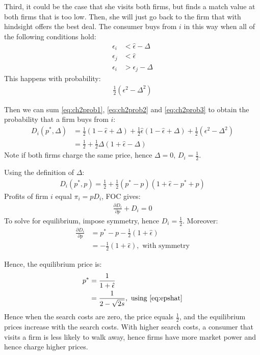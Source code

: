 \documentclass[12pt]{article}
\numberwithin{equation}{section}
\newcommand{\1}[1]{\,\mathbbm{1}_{#1}} %
\begin{document}
Third, it could be the case that she visits both firms, but finds a match value at both
firms that is too low. Then, she will just go back to the firm that with hindsight offers
the best deal. The consumer buys from $i$ in this way when all of the
following conditions hold:
\begin{align}
	\epsilon_i & <\hat\epsilon-\Delta \\
	\epsilon_j & <\hat\epsilon        \\
	\epsilon_i & >\epsilon_j-\Delta
\end{align}
This happens with probability:
\begin{align}
	\frac{1}{2}(\epsilon^2-\Delta^2)
	\label{eq:ch2prob3}
\end{align}

Then we can sum \ref{eq:ch2prob1}, \ref{eq:ch2prob2} and
\ref{eq:ch2prob3} to obtain the probability that a firm buys from $i$:
\begin{align}
	D_i(p^*,\Delta) & =
	\frac{1}{2}(1-\hat\epsilon+\Delta)+
	\frac{1}{2}\hat\epsilon(1-\hat\epsilon+\Delta)+
	\frac{1}{2}(\epsilon^2-\Delta^2)                                         \\
	                & = \frac{1}{2}+\frac{1}{2}\Delta(1+\hat\epsilon-\Delta)
\end{align}
Note if both firms charge the same price, hence $\Delta=0$,
$D_i=\frac{1}{2}$.

Using the definition of $\Delta$:
\begin{align}
	D_i(p^*,p)=\frac{1}{2}+\frac{1}{2}(p^*-p)(1+\hat\epsilon-p^*+p)
\end{align}
Profits of firm $i$ equal $\pi_i=pD_i$, FOC gives:
\begin{align}
	\frac{\partial D_i}{\partial p}+D_i=0
\end{align}
To solve for equilibrium, impose symmetry, hence $D_i=\frac{1}{2}$.
Moreover:
\begin{align}
	\frac{\partial D_i}{\partial p} & =p^*-p-\frac{1}{2}(1+\hat\epsilon)                  \\
	                                & =-\frac{1}{2}(1+\hat\epsilon),\text{ with symmetry}
\end{align}

Hence, the equilibrium price is:
\begin{align}
	p^* & =\frac{1}{1+\hat\epsilon}                            \\
	    & =\frac{1}{2-\sqrt{2s}},\text{ using \ref{eq:epshat}}
\end{align}
Hence when the search costs are zero, the price equals $\frac{1}{2}$,
and the equilibrium prices increase with the search costs. With higher search
costs, a consumer that visits a firm is less likely to walk away, hence
firms have more market power and hence charge higher prices.
\end{document}
